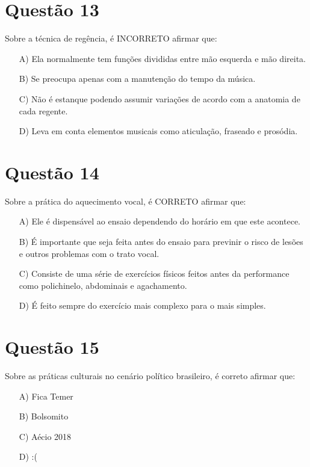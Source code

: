 \documentclass[a4paper, 12pt, openright, oneside, english, brazil, article]{abntex2}
\begin{document}
	
	\section{Questão 13}
	
	Sobre a técnica de regência, é INCORRETO afirmar que:
	
	\begin{enumerate}
		\item [A)] Ela normalmente tem funções divididas entre mão esquerda e mão direita.
		\item [B)] Se preocupa apenas com a manutenção do tempo da música.
		\item [C)] Não é estanque podendo assumir variações de acordo com a anatomia de cada regente.
		\item [D)] Leva em conta elementos musicais como aticulação, fraseado e prosódia.
	\end{enumerate}
	
	
	\section{Questão 14}
	
	Sobre a prática do aquecimento vocal, é CORRETO afirmar que:
	
	\begin{enumerate}
		\item [A)] Ele é dispensável ao ensaio dependendo do horário em que este acontece.
		\item [B)] É importante que seja feita antes do ensaio para previnir o risco de lesões e outros problemas com o trato vocal.
		\item [C)] Consiste de uma série de exercícios físicos feitos antes da performance como polichinelo, abdominais e agachamento.
		\item [D)] É feito sempre do exercício mais complexo para o mais simples.
	\end{enumerate}
	
	
	\section{Questão 15}
	
	Sobre as práticas culturais no cenário político brasileiro, é correto afirmar que:
	
	\begin{enumerate}
		\item [A)] Fica Temer 
		\item [B)] Bolsomito
		\item [C)] Aécio 2018
		\item [D)] :(
	\end{enumerate}
	
	
	
	
	
	
	
\end{document}
